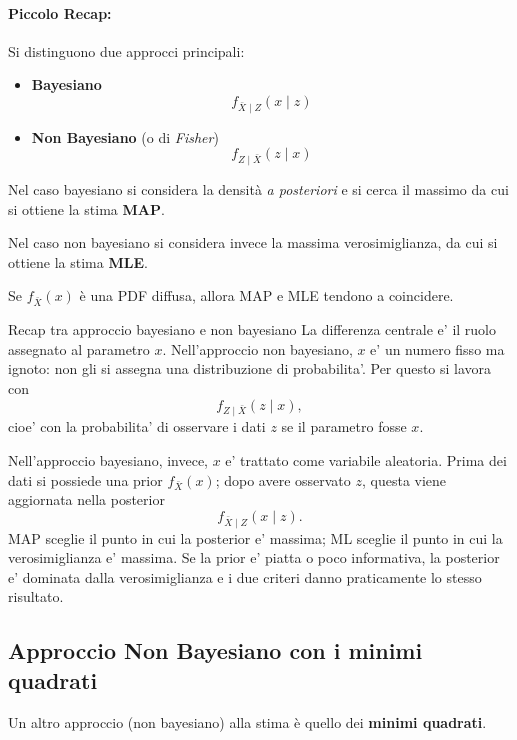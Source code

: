 \documentclass[11pt,a4paper]{article}
\begin{document}
\paragraph{Piccolo Recap:}

Si distinguono due approcci principali:

\begin{itemize}
    \item \textbf{Bayesiano}
    \[
    f_{\bar{X}\mid Z}(x\mid z)
    \]

    \item \textbf{Non Bayesiano} (o di \emph{Fisher})
    \[
    f_{Z\mid \bar{X}}(z\mid x)
    \]
\end{itemize}

Nel caso bayesiano si considera la densità \emph{a posteriori} e si cerca il massimo da cui si ottiene la stima \textbf{MAP}.

Nel caso non bayesiano si considera invece la massima verosimiglianza, da cui si ottiene la stima \textbf{MLE}.

Se \(f_{\bar{X}}(x)\) è una PDF diffusa, allora MAP e MLE tendono a coincidere.

\begin{spiegazione}{Recap tra approccio bayesiano e non bayesiano}
La differenza centrale e' il ruolo assegnato al parametro $x$. Nell'approccio non bayesiano, $x$ e' un numero fisso ma ignoto: non gli si assegna una distribuzione di probabilita'. Per questo si lavora con
\[
f_{Z\mid \bar X}(z\mid x),
\]
cioe' con la probabilita' di osservare i dati $z$ se il parametro fosse $x$.

Nell'approccio bayesiano, invece, $x$ e' trattato come variabile aleatoria. Prima dei dati si possiede una prior $f_{\bar X}(x)$; dopo avere osservato $z$, questa viene aggiornata nella posterior
\[
f_{\bar X\mid Z}(x\mid z).
\]
MAP sceglie il punto in cui la posterior e' massima; ML sceglie il punto in cui la verosimiglianza e' massima. Se la prior e' piatta o poco informativa, la posterior e' dominata dalla verosimiglianza e i due criteri danno praticamente lo stesso risultato.
\end{spiegazione}

\vspace{1em}

\subsection{Approccio Non Bayesiano con i minimi quadrati}
Un altro approccio (non bayesiano) alla stima è quello dei \textbf{minimi quadrati}.
\end{document}
